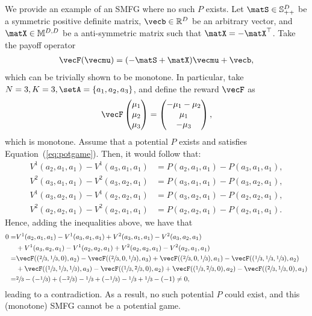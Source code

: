 \begin{remark}
We provide an example of an SMFG where no such $P$ exists.
Let $\matS \in \mathbb{S}_{++}^{D}$ be a symmetric positive definite matrix, $\vecb\in\mathbb{R}^D$ be an arbitrary vector, and $\matX \in \mathbb{M}^{D, D}$ be a anti-symmetric matrix such that $\matX = -\matX^\top$.
Take the payoff operator
\begin{align*}
    \vecF(\vecmu) = (-\matS + \matX) \vecmu + \vecb,
\end{align*}
which can be trivially shown to be monotone.
In particular, take $N=3, K=3, \setA = \{ a_1, a_2, a_3\}$, and define the reward $\vecF$ as
\begin{align*}
    \vecF \begin{pmatrix}
\mu_1 \\
\mu_2 \\
\mu_3
\end{pmatrix} = \begin{pmatrix}
-\mu_1 - \mu_2 \\
\mu_1 \\
-\mu_3
\end{pmatrix},
\end{align*}
which is monotone.
Assume that a potential $P$ exists and satisfies Equation~(\ref{eq:potgame}).
Then, it would follow that:
\begin{align*}
    V^1(a_2, a_1, a_1) - V^1(a_3, a_1, a_1) &= P(a_2, a_1, a_1) - P(a_3, a_1, a_1), \\
    V^2(a_3, a_1, a_1) - V^2(a_3, a_2, a_1) &= P(a_3, a_1, a_1) - P(a_3, a_2, a_1), \\
    V^1(a_3, a_2, a_1) - V^1(a_2, a_2, a_1) &= P(a_3, a_2, a_1) - P(a_2, a_2, a_1), \\
    V^2(a_2, a_2, a_1) - V^2(a_2, a_1, a_1) &= P(a_2, a_2, a_1) - P(a_2, a_1, a_1) .
\end{align*}
Hence, adding the inequalities above, we have that
\begin{align*}
    0 = & V^1(a_2, a_1, a_1) - V^1(a_3, a_1, a_1)
        + V^2(a_3, a_1, a_1) - V^2(a_3, a_2, a_1) \\
        & + V^1(a_3, a_2, a_1) - V^1(a_2, a_2, a_1)  
        + V^2(a_2, a_2, a_1) - V^2(a_2, a_1, a_1) \\
     = & \vecF((\sfrac{2}{3}, \sfrac{1}{3}, 0), a_2) - \vecF((\sfrac{2}{3}, 0, \sfrac{1}{3}), a_3) +
     \vecF((\sfrac{2}{3}, 0, \sfrac{1}{3}), a_1) - \vecF((\sfrac{1}{3}, \sfrac{1}{3}, \sfrac{1}{3}), a_2) \\
     & + \vecF((\sfrac{1}{3}, \sfrac{1}{3}, \sfrac{1}{3}), a_3) - \vecF((\sfrac{1}{3}, \sfrac{2}{3}, 0), a_2)
     + \vecF((\sfrac{1}{3},\sfrac{2}{3},0), a_2) - \vecF((\sfrac{2}{3},\sfrac{1}{3},0), a_1) \\
     = &  \sfrac{2}{3} -  (-\sfrac{1}{3}) 
     + (-\sfrac{2}{3}) - \sfrac{1}{3} 
     + (-\sfrac{1}{3}) - \sfrac{1}{3}
     + \sfrac{1}{3} - (-1) 
     \neq  0,
\end{align*}
leading to a contradiction.
As a result,  no such potential $P$ could exist, and this (monotone) SMFG cannot be a potential game.
\end{remark}


